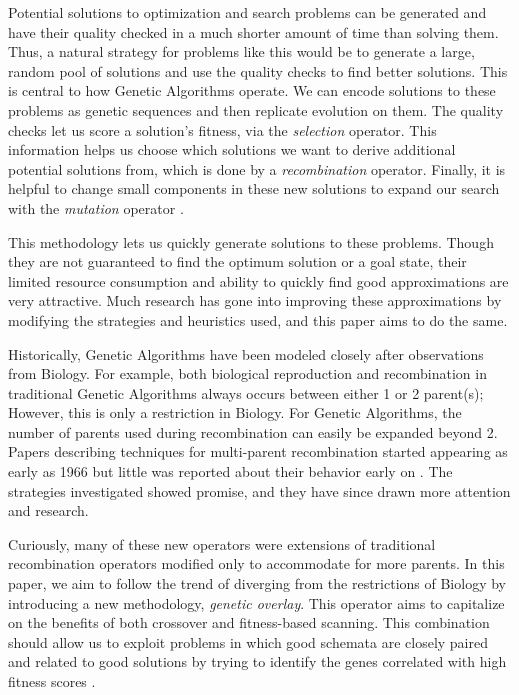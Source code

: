 Potential solutions to optimization and search problems can be generated and have their quality checked in a much shorter amount of time than solving them. Thus, a natural strategy for problems like this would be to generate a large, random pool of solutions and use the quality checks to find better solutions. This is central to how Genetic Algorithms operate. We can encode solutions to these problems as genetic sequences and then replicate evolution on them. The quality checks let us score a solution's fitness, via the \emph{selection} operator. This information helps us choose which solutions we want to derive additional potential solutions from, which is done by a \emph{recombination} operator. Finally, it is helpful to change small components in these new solutions to expand our search with the \emph{mutation} operator \cite{Deb99}.

This methodology lets us quickly generate solutions to these problems. Though they are not guaranteed to find the optimum solution or a goal state, their limited resource consumption and ability to quickly find good approximations are very attractive\cite{Russell10}. Much research has gone into improving these approximations by modifying the strategies and heuristics used, and this paper aims to do the same.

Historically, Genetic Algorithms have been modeled closely after observations from Biology. For example, both biological reproduction and recombination in traditional Genetic Algorithms always occurs between either 1 or 2 parent(s); However, this is only a restriction in Biology\cite{Eiben95}. For Genetic Algorithms, the number of parents used during recombination can easily be expanded beyond 2. Papers describing techniques for multi-parent recombination started appearing as early as 1966 but little was reported about their behavior early on \cite{Eiben03}. The strategies investigated showed promise, and they have since drawn more attention and research\cite{Eiben94}. 

Curiously, many of these new operators were extensions of traditional recombination operators modified only to accommodate for more parents. In this paper, we aim to follow the trend of diverging from the restrictions of Biology by introducing a new methodology, \emph{genetic overlay}. This operator aims to capitalize on the benefits of both crossover and fitness-based scanning. This combination should allow us to exploit problems in which good schemata are closely paired and related to good solutions by trying to identify the genes correlated with high fitness scores \cite{Russell10}. 